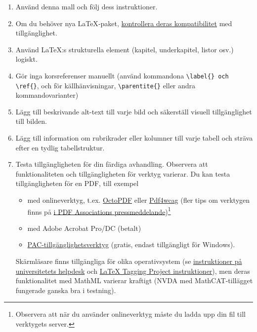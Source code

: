 \documentclass[swedish, manual, a4paper]{csthesis}
\begin{document}
\begin{enumerate}
    \item Använd denna mall och följ dess instruktioner.
    \item Om du behöver nya \LaTeX‑paket, \href{https://latex3.github.io/tagging-project/tagging-status/}{kontrollera  deras kompatibilitet} med tillgänglighet.
    \item Använd \LaTeX:s strukturella element (kapitel, underkapitel, listor osv.) logiskt.
\item Gör inga korsreferenser manuellt (använd kommandona \texttt{\textbackslash label\{\} och \texttt{\textbackslash ref\{\}}}, och för källhänvisningar, \texttt{\textbackslash parentite\{\}} eller andra kommandovarianter)
\item Lägg till beskrivande alt-text till varje bild och säkerställ visuell tillgänglighet till bilden.
\item Lägg till information om rubrikrader eller kolumner till varje tabell och sträva efter en tydlig tabellstruktur.
\item Testa tillgängligheten för din färdiga avhandling. Observera att funktionaliteten och tillgängligheten för verktyg varierar. Du kan testa tillgängligheten för en PDF, till exempel
\begin{itemize}
\item med onlineverktyg, t.ex. \href{https://octopdf.com}{OctoPDF} eller \href{https://pdf4wcag.com}{Pdf4wcag} (fler tips om verktygen finns på \href{https://pdfa.org/accessible-math-in-pdf-finally}{i PDF Associations pressmeddelande})\footnote{Observera att när du använder onlineverktyg måste du ladda upp din fil till verktygets server.}
\item med Adobe Acrobat Pro/DC (betalt)
\item \href{https://pac.pdf-accessibility.org/en}{PAC-tillgänglighetsverktyg} (gratis, endast tillgängligt för Windows).
\end{itemize}
Skärmläsare finns tillgängliga för olika operativsystem (se \href{https://helpdesk.it.helsinki.fi/help/20057}{instruktioner på universitetets helpdesk} och \href{https://latex3.github.io/tagging-project/documentation/wtpdf/fulldoc}{LaTeX{} Tagging Project instruktioner}), men deras funktionalitet med MathML varierar kraftigt (NVDA med MathCAT-tillägget fungerade ganska bra i testning). 
\end{enumerate}


\printbibliography[heading=bibintoc,title=\mybibname]%
\label{last_bib_page}
\end{document}
